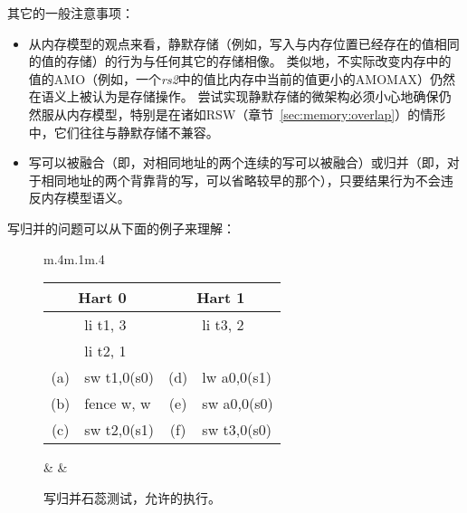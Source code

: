 其它的一般注意事项：

\begin{itemize}
  \item 从内存模型的观点来看，静默存储（例如，写入与内存位置已经存在的值相同的值的存储）的行为与任何其它的存储相像。
  类似地，不实际改变内存中的值的AMO（例如，一个{\em rs2}中的值比内存中当前的值更小的AMOMAX）仍然在语义上被认为是存储操作。
  尝试实现静默存储的微架构必须小心地确保仍然服从内存模型，特别是在诸如RSW（章节~\ref{sec:memory:overlap}）的情形中，它们往往与静默存储不兼容。
  \item 写可以被融合（即，对相同地址的两个连续的写可以被融合）或归并（即，对于相同地址的两个背靠背的写，可以省略较早的那个），只要结果行为不会违反内存模型语义。
\end{itemize}

写归并的问题可以从下面的例子来理解：
\begin{figure}[h!]
  \centering
  \begin{tabular}{m{.4\linewidth}m{.1\linewidth}m{.4\linewidth}}
    \tt\small
    \begin{tabular}{cl||cl}
    \multicolumn{2}{c}{Hart 0} & \multicolumn{2}{c}{Hart 1} \\
    \hline
        & li t1, 3    &     & li  t3, 2    \\
        & li t2, 1    &     &              \\
    (a) & sw t1,0(s0) & (d) & lw  a0,0(s1) \\
    (b) & fence w, w  & (e) & sw  a0,0(s0) \\
    (c) & sw t2,0(s1) & (f) & sw  t3,0(s0) \\
    \end{tabular}
  & &
    
  \end{tabular}
  \caption{写归并石蕊测试，允许的执行。
  }
  \label{fig:litmus:subsumption}
\end{figure}

